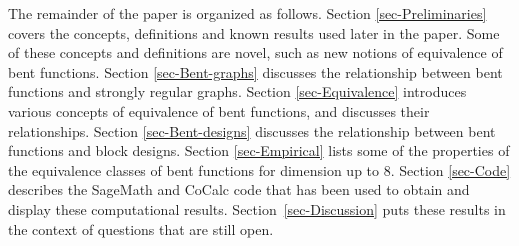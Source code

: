 \documentclass[12pt,a4paper]{article}
\newcommand{\mb}[1]{\mathbb{#1}}
\newcommand{\F}{\mb{F}}
\newtheorem{Theorem}{Theorem}
\begin{document}
%
%
The remainder of the paper is organized as follows.
Section \ref{sec-Preliminaries} covers the concepts, definitions and known results used later in the paper.
Some of these concepts and definitions are novel, such as new notions of equivalence of bent
functions.
Section \ref{sec-Bent-graphs} discusses the relationship between bent functions and strongly regular graphs.
Section \ref{sec-Equivalence} introduces various concepts of equivalence of bent functions,
and discusses their relationships.
Section \ref{sec-Bent-designs} discusses the relationship between bent functions and block designs.
Section \ref{sec-Empirical} lists some of the properties of the equivalence classes of bent functions for dimension up to 8.
Section \ref{sec-Code} describes the SageMath and CoCalc code that has been used to obtain
and display these computational results.
Section~\ref{sec-Discussion} puts these results in the context of questions that are still open.
%
%
%
%
%
%
%
%
%
%
%
\end{document}
